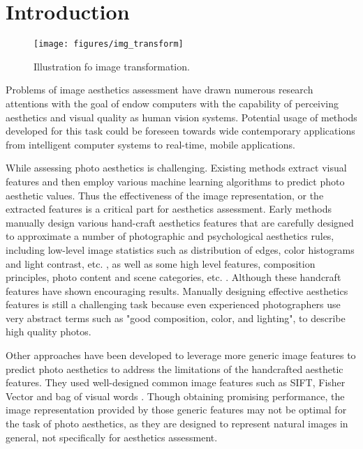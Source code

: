\documentclass[10pt,twocolumn,letterpaper]{article}
\begin{document}
\section{Introduction}

\begin{figure}
	\centering
	\texttt{[image: figures/img\_transform]}
	\label{transform}
	\caption{Illustration fo image transformation.}
\end{figure}
Problems of image aesthetics assessment 
have drawn numerous research attentions with the goal of 
endow computers with the capability of perceiving aesthetics and
visual quality as human vision systems. Potential usage
of methods developed for this task could be foreseen
towards wide contemporary applications from intelligent computer
systems to real-time, mobile applications. 

While assessing photo aesthetics is challenging. Existing methods extract visual features and then employ various machine learning algorithms to predict photo aesthetic values. Thus the effectiveness of the image representation, or the extracted features is a critical part for aesthetics assessment. Early methods manually design various hand-craft aesthetics features that are carefully designed to approximate a number of photographic and psychological aesthetics rules, including low-level image statistics such as distribution of edges, color histograms and light contrast, etc. \cite{Luo:2008:ECCV} \cite{Bhattacharya:2010:ACMMM} \cite{Cohen-Or:2006:SIGGRAPH}, 
as well as some high level features, composition principles, photo content 
and scene categories, etc.\cite{Tang:2013:TMM} \cite{Sagnik:2011:CVPR}.
Although these handcraft features have shown encouraging 
results. Manually designing effective aesthetics
features is still a challenging task because even experienced
photographers use very abstract terms such as "good composition,
color, and lighting", to describe high quality photos. 

Other approaches have been developed to leverage more 
generic image features to predict photo aesthetics to 
address the limitations of the handcrafted aesthetic features. 
They used well-designed common image features such as SIFT, Fisher Vector 
\cite{Marchesotti:2011:ICCV} \cite{Perronnin:2010:ECCV}  
and bag of visual words \cite{Su:2011:ACMMM}. Though obtaining
promising performance, the image representation provided
by those generic features may not be optimal for the 
task of photo aesthetics, as they are designed to represent natural images in
general, not specifically for aesthetics assessment.
\end{document}
